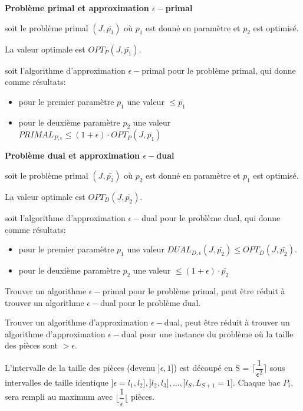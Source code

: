 \documentclass[a4paper,12pt]{report}
\theoremstyle{plain}				%
\theoremstyle{definition}				%
\begin{document}
\bigskip

\textbf{Problème primal et approximation $\epsilon-$primal}

soit le problème primal $(J,\bar{p_1})$
où $p_1$ est donné en paramètre et $p_2$ est optimisé.

La valeur optimale est $OPT_P(J,\bar{p_1})$.

soit l'algorithme d'approximation $\epsilon-$primal pour le problème primal, qui donne comme résultats:

\begin{itemize}
\item pour le premier paramètre $p_1$ une valeur $\le \bar{p_1}$
\item pour le deuxième paramètre $p_2$ une valeur $PRIMAL_{P,\epsilon} \le (1+\epsilon)\cdot OPT_P(J,\bar{p_1})$
\end{itemize}
\bigskip

\textbf{Problème dual et approximation $\epsilon-$dual}

soit le problème primal $(J,\bar{p_2})$
où $p_2$ est donné en paramètre et $p_1$ est optimisé.

La valeur optimale est $OPT_D(J,\bar{p_2})$.

soit l'algorithme d'approximation $\epsilon-$dual pour le problème dual, qui donne comme résultats:

\begin{itemize}
\item pour le premier paramètre $p_1$ une valeur $DUAL_{D,\epsilon}(J, \bar{p_2})\le OPT_D(J,\bar{p_2})$.
\item pour le deuxième paramètre $p_2$ une valeur $ \le (1+\epsilon)\cdot \bar{p_2}$
\end{itemize}

\bigskip

Trouver un algorithme $\epsilon-$primal pour le problème primal,
peut être réduit à trouver un algorithme $\epsilon-$dual pour le problème dual.

Trouver un algorithme d'approximation $\epsilon-$dual, peut être réduit à trouver un algorithme
d'approximation $\epsilon-$dual pour une instance du problème où la taille des pièces sont $> \epsilon$.

L'intervalle de la taille des pièces (devenu $]\epsilon, 1]$) est
découpé en S = $\lceil \dfrac{1}{\epsilon^2}\rceil$ sous intervalles
de taille identique
$]\epsilon = l_1, l_2], ]l_2, l_3], \ldots , ]l_S, L_{S+1}=1]$.
Chaque bac $P_i$, sera rempli au maximum avec
$\lfloor \dfrac{1}{\epsilon} \lfloor$ pièces.
\end{document}
